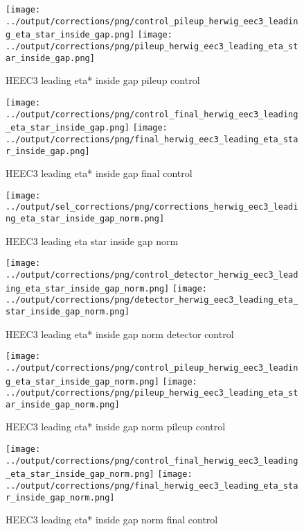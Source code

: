 \documentclass[11pt]{book}
\begin{document}
\begin{figure}[ht]
\centering
\texttt{[image: ../output/corrections/png/control\_pileup\_herwig\_eec3\_leading\_eta\_star\_inside\_gap.png]}
\texttt{[image: ../output/corrections/png/pileup\_herwig\_eec3\_leading\_eta\_star\_inside\_gap.png]}
\caption{HEEC3 leading eta* inside gap pileup control}
\label{fig:HEEC3_leading_eta_star_inside_gap_pileup_control}
\end{figure}


\begin{figure}[ht]
\centering
\texttt{[image: ../output/corrections/png/control\_final\_herwig\_eec3\_leading\_eta\_star\_inside\_gap.png]}
\texttt{[image: ../output/corrections/png/final\_herwig\_eec3\_leading\_eta\_star\_inside\_gap.png]}
\caption{HEEC3 leading eta* inside gap final control}
\label{fig:HEEC3_leading_eta_star_inside_gap_final_control}
\end{figure}

\begin{figure}[ht]
\centering
\texttt{[image: ../output/sel\_corrections/png/corrections\_herwig\_eec3\_leading\_eta\_star\_inside\_gap\_norm.png]}
\caption{HEEC3 leading eta star inside gap norm}
\label{fig:HEEC3_leading_eta_star_inside_gap_norm}
\end{figure}


\begin{figure}[ht]
\centering
\texttt{[image: ../output/corrections/png/control\_detector\_herwig\_eec3\_leading\_eta\_star\_inside\_gap\_norm.png]}
\texttt{[image: ../output/corrections/png/detector\_herwig\_eec3\_leading\_eta\_star\_inside\_gap\_norm.png]}
\caption{HEEC3 leading eta* inside gap norm detector control}
\label{fig:HEEC3_leading_eta_star_inside_gap_norm_detector_control}
\end{figure}

\begin{figure}[ht]
\centering
\texttt{[image: ../output/corrections/png/control\_pileup\_herwig\_eec3\_leading\_eta\_star\_inside\_gap\_norm.png]}
\texttt{[image: ../output/corrections/png/pileup\_herwig\_eec3\_leading\_eta\_star\_inside\_gap\_norm.png]}
\caption{HEEC3 leading eta* inside gap norm pileup control}
\label{fig:HEEC3_leading_eta_star_inside_gap_norm_pileup_control}
\end{figure}


\begin{figure}[ht]
\centering
\texttt{[image: ../output/corrections/png/control\_final\_herwig\_eec3\_leading\_eta\_star\_inside\_gap\_norm.png]}
\texttt{[image: ../output/corrections/png/final\_herwig\_eec3\_leading\_eta\_star\_inside\_gap\_norm.png]}
\caption{HEEC3 leading eta* inside gap norm final control}
\label{fig:HEEC3_leading_eta_star_inside_gap_norm_final_control}
\end{figure}
\end{document}
